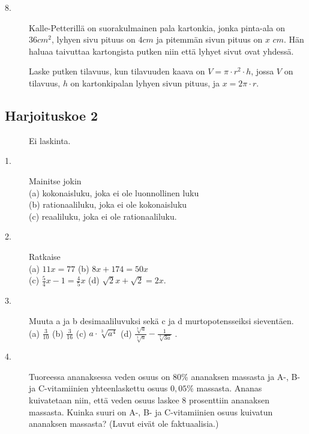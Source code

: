\begin{description}
	\item[8.] Kalle-Petterillä on suorakulmainen pala kartonkia, jonka pinta-ala on $36cm^2$, lyhyen sivu pituus on $4cm$ ja pitemmän sivun pituus on $x$ $cm$. 
	Hän haluaa taivuttaa kartongista putken niin että lyhyet sivut ovat yhdessä. 
	
	Laske putken tilavuus, kun tilavuuden kaava on $V=\pi\cdot r^2\cdot h$, jossa $V$ on tilavuus, $h$ on kartonkipalan lyhyen sivun pituus, ja $x=2\pi\cdot r$.    
\end{description}

\subsection*{Harjoituskoe 2}

\begin{description}
	\item[] Ei laskinta.
	\item[1.] Mainitse jokin \\
	(a) kokonaisluku, joka ei ole luonnollinen luku \\
	(b) rationaaliluku, joka ei ole kokonaisluku \\
	(c) reaaliluku, joka ei ole rationaaliluku.
	\item[2.] Ratkaise \\
	(a) $11x=77$ \qquad
	(b) $8x+174=50x$ \\
	(c) $\frac{5}{4}x-1=\frac{4}{5}x$ \qquad
	(d) $\sqrt{2}x+\sqrt{2}=2x$.
	\item[3.] Muuta a ja b desimaaliluvuksi sekä c ja d murtopotensseiksi sieventäen. \\
	(a) $\frac{3}{10}$ \qquad
	(b) $\frac{3}{16}$ \qquad
	(c) $a\cdot \sqrt[3]{a^4}$\qquad
	(d) $\frac{\sqrt[3]{a}}{\sqrt[3]{a}}-\frac{1}{\sqrt[3]{3a}}$ .
	\item[4.] Tuoreessa ananaksessa veden osuus on 80\% ananaksen massasta ja A-, B- ja C-vitamiinien yhteenlaskettu osuus $0,05\%$ massasta. Ananas kuivatetaan niin, että veden osuus laskee 8 prosenttiin ananaksen massasta. Kuinka suuri on A-, B- ja C-vitamiinien osuus kuivatun ananaksen massasta? (Luvut eivät ole faktuaalisia.)
	

\end{description}
